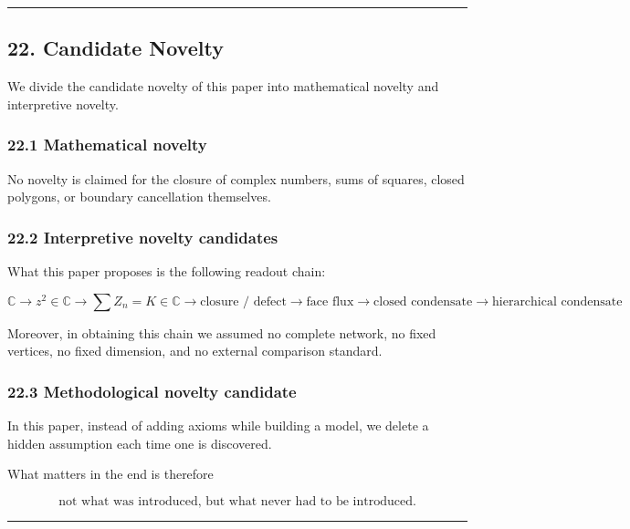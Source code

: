 \documentclass[
  a4paper,
]{article}
\begin{document}
\begin{center}\rule{0.5\linewidth}{0.5pt}\end{center}

\subsection{22. Candidate Novelty}\label{candidate-novelty}

We divide the candidate novelty of this paper into mathematical novelty
and interpretive novelty.

\subsubsection{22.1 Mathematical novelty}\label{mathematical-novelty}

No novelty is claimed for the closure of complex numbers, sums of
squares, closed polygons, or boundary cancellation themselves.

\subsubsection{22.2 Interpretive novelty
candidates}\label{interpretive-novelty-candidates}

What this paper proposes is the following readout chain:

\[
\boxed{
\mathbb C
\to
z^2\in\mathbb C
\to
\sum Z_n=K\in\mathbb C
\to
\text{closure / defect}
\to
\text{face flux}
\to
\text{closed condensate}
\to
\text{hierarchical condensate}
}
\]

Moreover, in obtaining this chain we assumed no complete network, no
fixed vertices, no fixed dimension, and no external comparison standard.

\subsubsection{22.3 Methodological novelty
candidate}\label{methodological-novelty-candidate}

In this paper, instead of adding axioms while building a model, we
delete a hidden assumption each time one is discovered.

What matters in the end is therefore

\[
\boxed{\text{not what was introduced, but what never had to be introduced.}}
\]

\begin{center}\rule{0.5\linewidth}{0.5pt}\end{center}
\end{document}
